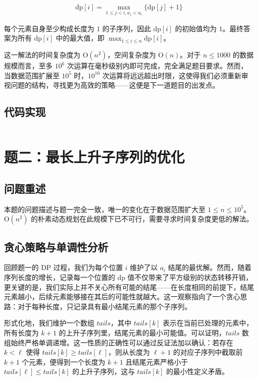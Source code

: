 \documentclass[12pt, a4paper]{academics}
\begin{document}
\[
\mathrm{dp}[i] = \max_{1 \le j < i, a_j < a_i}\{\mathrm{dp}[j] + 1\}
\]

每个元素自身至少构成长度为 $1$ 的子序列，因此 $\mathrm{dp}[i]$ 的初始值均为 $1$。最终答案为所有 $\mathrm{dp}[i]$ 中的最大值，即 $\displaystyle \max_{1 \le i \le n} \mathrm{dp}[i]$。

这一解法的时间复杂度为 $\mathrm{O}(n^2)$，空间复杂度为 $\mathrm{O}(n)$。对于 $n \le 1000$ 的数据规模而言，至多 $10^6$ 次运算在毫秒级别内即可完成，完全满足题目要求。然而，当数据范围扩展至 $10^5$ 时，$10^{10}$ 次运算将远远超出时限，这使得我们必须重新审视问题的结构，寻找更为高效的策略——这便是下一道题目的出发点。

\subsection{代码实现}

\inputminted{c++}{../src/p1_lis_dp.cpp}

\section{题二：最长上升子序列的优化}

\subsection{问题重述}

本题的问题描述与题一完全一致，唯一的变化在于数据范围扩大至 $1 \le n \le 10^5$。$\mathrm{O}(n^2)$ 的朴素动态规划在此规模下已不可行，需要寻求时间复杂度更低的解法。

\subsection{贪心策略与单调性分析}

回顾题一的 DP 过程，我们为每个位置 $i$ 维护了以 $a_i$ 结尾的最优解。然而，随着序列长度的增长，记录每一个位置的 $\mathrm{dp}$ 值不仅带来了平方级别的状态转移开销，更关键的是，我们实际上并不关心所有可能的结尾——在长度相同的前提下，结尾元素越小，后续元素能够接在其后的可能性就越大。这一观察指向了一个贪心思路：对于每种长度，只记录具有最小结尾元素的那个子序列。

形式化地，我们维护一个数组 $\mathit{tails}$，其中 $\mathit{tails}[k]$ 表示在当前已处理的元素中，所有长度为 $k+1$ 的上升子序列里，结尾元素的最小可能值。可以证明，$\mathit{tails}$ 数组始终严格单调递增。这一性质的正确性可以通过反证法加以确认：若存在 $k < \ell$ 使得 $\mathit{tails}[k] \ge \mathit{tails}[\ell]$，则从长度为 $\ell+1$ 的对应子序列中截取前 $k+1$ 个元素，便得到一个长度为 $k+1$ 且结尾元素严格小于 $\mathit{tails}[\ell] \le \mathit{tails}[k]$ 的上升子序列，这与 $\mathit{tails}[k]$ 的最小性定义矛盾。
\end{document}
